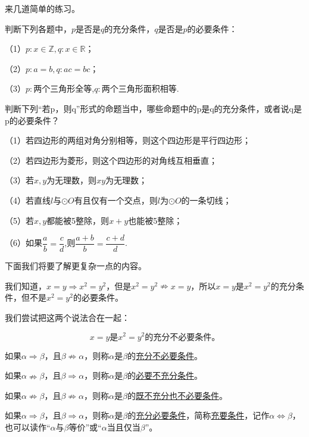 \documentclass[lang=cn,math=cm,chinesefont=nofont,11pt,scheme=chinese,twocol]{elegantbook}
\begin{document}
来几道简单的练习。

\begin{exercise}\label{202406262010}
  判断下列各题中，$p$是否是$q$的充分条件，$q$是否是$p$的必要条件：

  （1）$p:x\in\mathbb{Z},q:x\in\mathbb{R}$；

  （2）$p:a=b,q:ac=bc$；

  （3）$p:$两个三角形全等,$q:$两个三角形面积相等.
\end{exercise}

\begin{exercise}\label{202406262101}
  判断下列“若p，则q”形式的命题当中，哪些命题中的p是q的充分条件，或者说q是p的必要条件？

  （1）若四边形的两组对角分别相等，则这个四边形是平行四边形；

  （2）若四边形为菱形，则这个四边形的对角线互相垂直；

  （3）若$x,y$为无理数，则$xy$为无理数；

  （4）若直线$l$与$\odot O$有且仅有一个交点，则$l$为$\odot O$的一条切线；

  （5）若$x,y$都能被5整除，则$x+y$也能被5整除；

  \begin{spacing}{2.0}
    （6）如果$\dfrac{a}{b}=\dfrac{c}{d}$,则$\dfrac{a+b}{b}=\dfrac{c+d}{d}$.
  \end{spacing}
\end{exercise}

\hspace*{\fill}

下面我们将要了解更复杂一点的内容。

我们知道，$x=y\Rightarrow x^2=y^2$，但是$x^2=y^2\nRightarrow x=y$，所以$x=y$是$x^2=y^2$的充分条件，但不是$x^2=y^2$的必要条件。

我们尝试把这两个说法合在一起：

$$x=y\text{是}x^2=y^2\text{的}\textbf{充分不必要条件。}$$

\begin{definition}
  如果$\alpha\Rightarrow\beta$，且$\beta\nRightarrow\alpha$，则称$\alpha$是$\beta$的\underline{充分不必要条件}。

  如果$\alpha\nRightarrow\beta$，且$\beta\Rightarrow\alpha$，则称$\alpha$是$\beta$的\underline{必要不充分条件}。

  如果$\alpha\nRightarrow\beta$，且$\beta\nRightarrow\alpha$，则称$\alpha$是$\beta$的\underline{既不充分也不必要条件}。

  如果$\alpha\Rightarrow\beta$，且$\beta\Rightarrow\alpha$，则称$\alpha$是$\beta$的\underline{充分必要条件}，简称\underline{充要条件}，记作$\alpha\Leftrightarrow\beta$，也可以读作“$\alpha$与$\beta$等价”或“$\alpha$当且仅当$\beta$”。
\end{definition}
\end{document}
